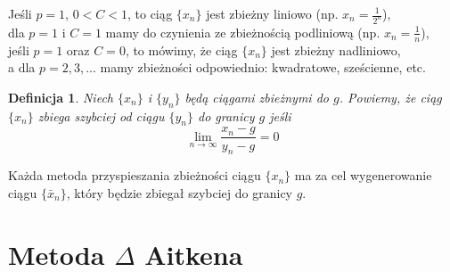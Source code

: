 \documentclass{article}
\newtheorem{defi}{Definicja}
\begin{document}
Jeśli $p=1$, $0<C<1$, to ciąg $\{x_n\}$ jest zbieżny liniowo (np. $x_n = \frac{1}{2^n}$), \\
dla $p=1$ i $C=1$ mamy do czynienia ze zbieżnością podliniową (np. $x_n = \frac{1}{n}$),\\
jeśli $p=1$ oraz $C=0$, to mówimy, że ciąg $\{x_n\}$ jest zbieżny nadliniowo, \\
a dla $p = 2,3,...$ mamy zbieżności odpowiednio: kwadratowe, sześcienne, etc.

\begin{defi}
Niech $\{x_n\}$ i $\{y_n\}$ będą ciągami zbieżnymi do $g$. Powiemy, że ciąg $\{x_n\}$ zbiega szybciej od ciągu $\{y_n\}$ do granicy $g$ jeśli
\begin{equation}
\lim_{n \to \infty} \frac{x_n - g}{y_n - g} = 0
\end{equation}
\end{defi}

Każda metoda przyspieszania zbieżności ciągu $\{x_n\}$ ma za cel wygenerowanie ciągu $\{\bar{x}_n\}$, który będzie zbiegał szybciej do granicy $g$.

\section{Metoda $\Delta$ Aitkena}
\end{document}
